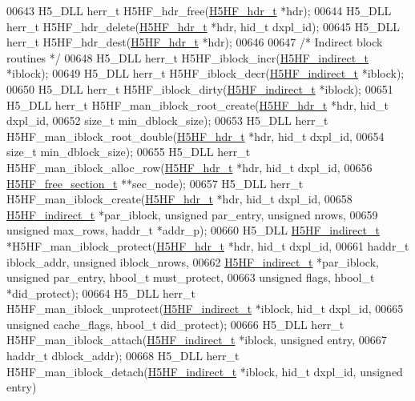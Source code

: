 \begin{DoxyCode}
00643 H5\_DLL herr\_t H5HF\_hdr\_free(\hyperlink{struct_h5_h_f__hdr__t}{H5HF\_hdr\_t} *hdr);
00644 H5\_DLL herr\_t H5HF\_hdr\_delete(\hyperlink{struct_h5_h_f__hdr__t}{H5HF\_hdr\_t} *hdr, hid\_t dxpl\_id);
00645 H5\_DLL herr\_t H5HF\_hdr\_dest(\hyperlink{struct_h5_h_f__hdr__t}{H5HF\_hdr\_t} *hdr);
00646 
00647 \textcolor{comment}{/* Indirect block routines */}
00648 H5\_DLL herr\_t H5HF\_iblock\_incr(\hyperlink{struct_h5_h_f__indirect__t}{H5HF\_indirect\_t} *iblock);
00649 H5\_DLL herr\_t H5HF\_iblock\_decr(\hyperlink{struct_h5_h_f__indirect__t}{H5HF\_indirect\_t} *iblock);
00650 H5\_DLL herr\_t H5HF\_iblock\_dirty(\hyperlink{struct_h5_h_f__indirect__t}{H5HF\_indirect\_t} *iblock);
00651 H5\_DLL herr\_t H5HF\_man\_iblock\_root\_create(\hyperlink{struct_h5_h_f__hdr__t}{H5HF\_hdr\_t} *hdr, hid\_t dxpl\_id,
00652     \textcolor{keywordtype}{size\_t} min\_dblock\_size);
00653 H5\_DLL herr\_t H5HF\_man\_iblock\_root\_double(\hyperlink{struct_h5_h_f__hdr__t}{H5HF\_hdr\_t} *hdr, hid\_t dxpl\_id,
00654     \textcolor{keywordtype}{size\_t} min\_dblock\_size);
00655 H5\_DLL herr\_t H5HF\_man\_iblock\_alloc\_row(\hyperlink{struct_h5_h_f__hdr__t}{H5HF\_hdr\_t} *hdr, hid\_t dxpl\_id,
00656     \hyperlink{struct_h5_h_f__free__section__t}{H5HF\_free\_section\_t} **sec\_node);
00657 H5\_DLL herr\_t H5HF\_man\_iblock\_create(\hyperlink{struct_h5_h_f__hdr__t}{H5HF\_hdr\_t} *hdr, hid\_t dxpl\_id,
00658     \hyperlink{struct_h5_h_f__indirect__t}{H5HF\_indirect\_t} *par\_iblock, \textcolor{keywordtype}{unsigned} par\_entry, \textcolor{keywordtype}{unsigned} nrows,
00659     \textcolor{keywordtype}{unsigned} max\_rows, haddr\_t *addr\_p);
00660 H5\_DLL \hyperlink{struct_h5_h_f__indirect__t}{H5HF\_indirect\_t} *H5HF\_man\_iblock\_protect(\hyperlink{struct_h5_h_f__hdr__t}{H5HF\_hdr\_t} *hdr, hid\_t dxpl\_id,
00661     haddr\_t iblock\_addr, \textcolor{keywordtype}{unsigned} iblock\_nrows,
00662     \hyperlink{struct_h5_h_f__indirect__t}{H5HF\_indirect\_t} *par\_iblock, \textcolor{keywordtype}{unsigned} par\_entry, hbool\_t must\_protect,
00663     \textcolor{keywordtype}{unsigned} flags, hbool\_t *did\_protect);
00664 H5\_DLL herr\_t H5HF\_man\_iblock\_unprotect(\hyperlink{struct_h5_h_f__indirect__t}{H5HF\_indirect\_t} *iblock, hid\_t dxpl\_id,
00665     \textcolor{keywordtype}{unsigned} cache\_flags, hbool\_t did\_protect);
00666 H5\_DLL herr\_t H5HF\_man\_iblock\_attach(\hyperlink{struct_h5_h_f__indirect__t}{H5HF\_indirect\_t} *iblock, \textcolor{keywordtype}{unsigned} entry,
00667     haddr\_t dblock\_addr);
00668 H5\_DLL herr\_t H5HF\_man\_iblock\_detach(\hyperlink{struct_h5_h_f__indirect__t}{H5HF\_indirect\_t} *iblock, hid\_t dxpl\_id, \textcolor{keywordtype}{unsigned} entry)

\end{DoxyCode}

